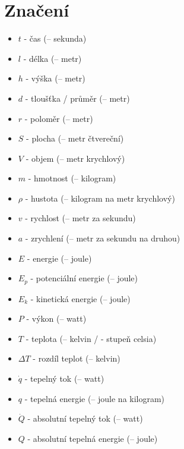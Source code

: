 \documentclass{article}
\begin{document}
\maketitle
\tableofcontents
\newpage



\section{Značení}

\begin{itemize}
    \item $t$ - čas (\ueqS \fs -- sekunda)
    \item $l$ - délka (\ueqM \fs -- metr)
    \item $h$ - výška (\ueqM \fs -- metr)
    \item $d$ - tloušťka / průměr (\ueqM \fs -- metr)
    \item $r$ - poloměr (\ueqM \fs -- metr)
    \item $S$ - plocha (\ueqMsq \fs -- metr čtvereční)
    \item $V$ - objem (\ueqMcu \fs -- metr krychlový)
    \item $m$ - hmotnost (\ueqKG \fs -- kilogram)
    \item $\rho$ - hustota (\ueqKGandMinvcu \fs -- kilogram na metr krychlový)
    \item $v$ - rychlost (\ueqMandSinv \fs -- metr za sekundu)
    \item $a$ - zrychlení (\ueqMandSinvsq \fs -- metr za sekundu na druhou)
    \item $E$ - energie (\ueqJ \fs -- joule)
    \item $E_p$ - potenciální energie (\ueqJ \fs -- joule)
    \item $E_k$ - kinetická energie (\ueqJ \fs -- joule)
    \item $P$ - výkon (\ueqW \fs -- watt)
    \item $T$ - teplota (\ueqK \fs -- kelvin / \ueqCELS \fs - stupeň celsia)
    \item $\Delta T$ - rozdíl teplot (\ueqK \fs -- kelvin)
    \item $\dot{q}$ - tepelný tok (\ueqWandMinvsq \fs -- watt)
    \item $q$ - tepelná energie (\ueqJandMinvsq \fs -- joule na kilogram)
    \item $\dot{Q}$ - absolutní tepelný tok (\ueqW \fs -- watt)
    \item $Q$ - absolutní tepelná energie (\ueqJ \fs -- joule)

\end{itemize}
\end{document}
